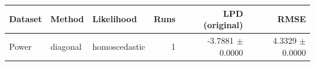 \begin{tabular}{lllrrr}
\toprule
Dataset & Method & Likelihood & Runs & LPD (original) & RMSE \\
\midrule
Power & diagonal & homoscedastic & 1 & -3.7881 $\pm$ 0.0000 & 4.3329 $\pm$ 0.0000 \\
\bottomrule
\end{tabular}
